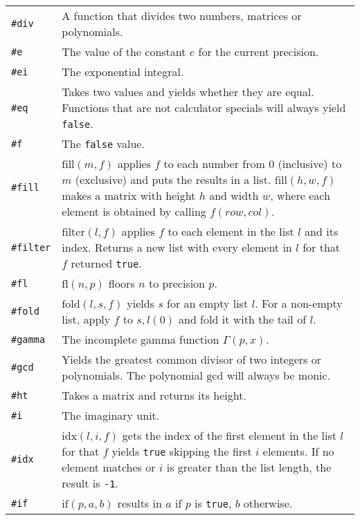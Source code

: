 \documentclass[10pt]{article}
\begin{document}
\begin{longtable}{p{}p{}}
        \verb|#div|       & A function that divides two numbers, matrices or polynomials. \\
        \verb|#e|         & The value of the constant $ e $ for the current precision. \\
        \verb|#ei|        & The exponential integral. \\
        \verb|#eq|        & Takes two values and yields whether they are equal.
                            Functions that are not calculator specials will always yield \verb|false|. \\
        \verb|#f|         & The \verb|false| value. \\
        \verb|#fill|      & $ \mathrm{fill}(m,f) $ applies $ f $ to each number from $ 0 $ (inclusive) to $ m $ (exclusive) and puts the results in a list.
                            $ \mathrm{fill}(h,w,f) $ makes a matrix with height $ h $ and width $ w $, where each element is obtained by calling $ f(row,col) $. \\
        \verb|#filter|    & $ \mathrm{filter}(l,f) $ applies $ f $ to each element in the list $ l $ and its index.
                            Returns a new list with every element in $ l $ for that $ f $ returned \verb|true|. \\
        \verb|#fl|        & $ \mathrm{fl}(n,p) $ floors $ n $ to precision $ p $. \\
        \verb|#fold|      & $ \mathrm{fold}(l,s,f) $ yields $ s $ for an empty list $ l $.
                            For a non-empty list, apply $ f $ to $ s, l(0) $ and fold it with the tail of $ l $. \\
        \verb|#gamma|     & The incomplete gamma function $ \Gamma(p, x) $. \\
        \verb|#gcd|       & Yields the greatest common divisor of two integers or polynomials.
                            The polynomial $ \mathrm{gcd} $ will always be monic. \\
        \verb|#ht|        & Takes a matrix and returns its height. \\
        \verb|#i|         & The imaginary unit. \\
        \verb|#idx|       & $ \mathrm{idx}(l,i,f) $ gets the index of the first element in the list $ l $ for that $ f $ yields \verb|true| skipping the first $ i $ elements.
                            If no element matches or $ i $ is greater than the list length, the result is \verb|-1|. \\
        \verb|#if|        & $ \mathrm{if}(p,a,b) $ results in $ a $ if $ p $ is \verb|true|, $ b $ otherwise. \\

\end{longtable}
\end{document}
